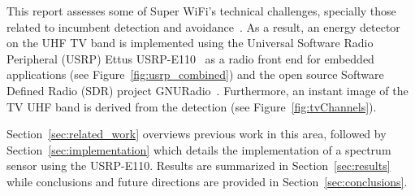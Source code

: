  This report assesses some of Super WiFi's technical challenges, specially those related to incumbent detection and avoidance~\cite{shellhammer2009technical}. As a result, an energy detector on the UHF TV band is implemented using the Universal Software Radio Peripheral (USRP) Ettus USRP-E110~\cite{ettusUSRPE110} as a radio front end for embedded applications (see Figure~\ref{fig:usrp_combined}) and the open source Software Defined Radio (SDR) project GNURadio~\cite{GNURadio}. Furthermore, an instant image of the TV UHF band is derived from the detection (see Figure~\ref{fig:tvChannels}).

Section~\ref{sec:related_work} overviews previous work in this area, followed by Section~\ref{sec:implementation} which details the implementation of a spectrum sensor using the USRP-E110. Results are summarized in Section~\ref{sec:results} while conclusions and future directions are provided in Section~\ref{sec:conclusions}.